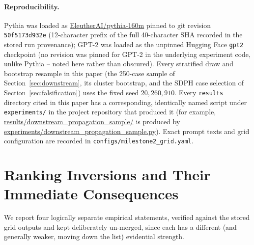 \documentclass[11pt]{article}
\begin{document}
\begin{small}
\paragraph{Reproducibility.} Pythia was loaded as
\url{EleutherAI/pythia-160m} pinned to git revision
\texttt{50f5173d932e} (12-character prefix of the full 40-character SHA
recorded in the stored run provenance); GPT-2 was loaded as the unpinned
Hugging Face \texttt{gpt2} checkpoint (no revision was pinned for GPT-2 in the
underlying experiment code, unlike Pythia -- noted here rather than
obscured). Every stratified draw and bootstrap resample in this paper (the
250-case sample of Section~\ref{sec:downstream}, its cluster bootstrap, and
the SDPH case selection of Section~\ref{sec:falsification}) uses the fixed
seed $20{,}260{,}910$. Every \texttt{results} directory cited in this paper has a corresponding,
identically named script under \texttt{experiments/} in the project
repository that produced it (for example,
\url{results/downstream_propagation_sample/} is produced by
\url{experiments/downstream_propagation_sample.py}). Exact prompt texts and
grid configuration are recorded in \texttt{configs/milestone2\_grid.yaml}.
\end{small}

\section{Ranking Inversions and Their Immediate Consequences}
\label{sec:consequences}

We report four logically separate empirical statements, verified against
the stored grid outputs and kept deliberately un-merged, since each has a
different (and generally weaker, moving down the list) evidential strength.
\end{document}
